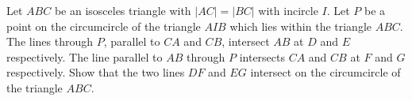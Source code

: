 Let $ABC$ be an isosceles triangle with $|AC|=|BC|$ with incircle $I$.
Let $P$ be a point on the circumcircle of the triangle $AIB$ which lies within the triangle $ABC$.
The lines through $P$, parallel to $CA$ and $CB$, intersect $AB$ at $D$ and $E$ respectively.
The line parallel to $AB$ through $P$ intersects $CA$ and $CB$ at $F$ and $G$ respectively.
Show that the two lines $DF$ and $EG$ intersect on the circumcircle of the triangle $ABC$.